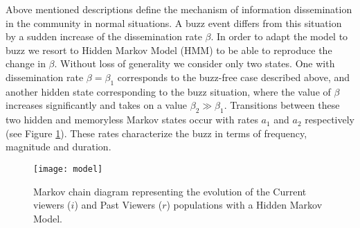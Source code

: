 \documentclass[twoside]{article}
\begin{document}
Above mentioned descriptions define the mechanism of information dissemination in the community in normal situations. A buzz event differs from this situation by a sudden increase of the dissemination rate $\beta$. In order to adapt the model to buzz we resort to Hidden Markov Model (HMM) to be able to reproduce the change in $\beta$. Without loss of generality we consider only two states. One with dissemination rate $\beta=\beta_{1}$ corresponds to the buzz-free case described above, and another hidden state corresponding to the buzz situation, where the value of $\beta$ increases significantly and takes on a value  $\beta_{2} \gg \beta_{1}$. Transitions between these two hidden and memoryless Markov states occur  with rates $a_{1}$ and $a_{2}$ respectively (see Figure \ref{fig:Markov}). These rates characterize the buzz in terms of frequency, magnitude and duration. 
\begin{figure}[h]
\centering
\texttt{[image: model]}
\caption{\small Markov chain diagram representing the evolution of the Current viewers ($i$) and Past Viewers ($r$) populations with a Hidden Markov Model. }
\label{fig:Markov}
\end{figure}
\end{document}
